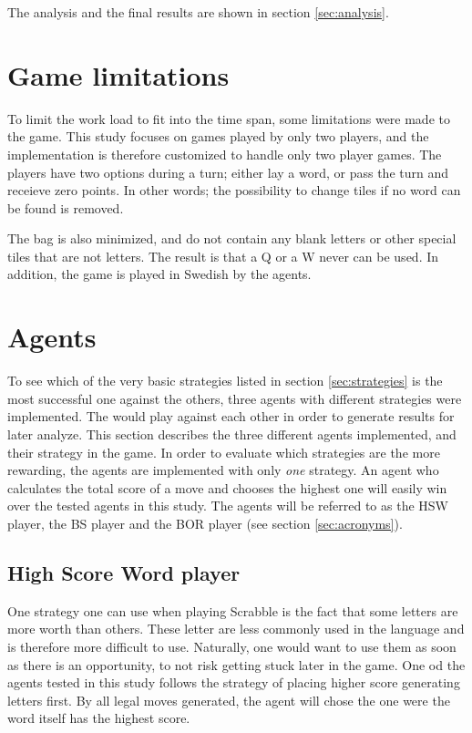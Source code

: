 \documentclass[a4paper, 12pt]{report}
\begin{document}
The analysis and the final results are shown in section \ref{sec:analysis}.

\section{Game limitations}
\label{sec:limitations}
To limit the work load to fit into the time span, some limitations were made to the game. This study focuses on games played by only two players, and the implementation is therefore customized to handle only two player games. The players have two options during a turn; either lay a word, or pass the turn and receieve zero points. In other words; the possibility to change tiles if no word can be found is removed. 

The bag is also minimized, and do not contain any blank letters or other special tiles that are not letters. The result is that a Q or a W never can be used. In addition, the game is played in Swedish by the agents.

\section{Agents}
\label{sec:agents}
To see which of the very basic strategies listed in section \ref{sec:strategies} is the most successful one against the others, three agents with different strategies were implemented. The would play against each other in order to generate results for later analyze. This section describes the three different agents implemented, and their strategy in the game. In order to evaluate which strategies are the more rewarding, the agents are implemented with only \emph{one} strategy. An agent who calculates the total score of a move and chooses the highest one will easily win over the tested agents in this study. The agents will be referred to as the HSW player, the BS player and the BOR player (see section \ref{sec:acronyms}).

\subsection{High Score Word player}
One strategy one can use when playing Scrabble is the fact that some letters are more worth than others. These letter are less commonly used in the language and is therefore more difficult to use. Naturally, one would want to use them as soon as there is an opportunity, to not risk getting stuck later in the game. One od the agents tested in this study follows the strategy of placing higher score generating letters first. By all legal moves generated, the agent will chose the one were the word itself has the highest score. 
\end{document}
